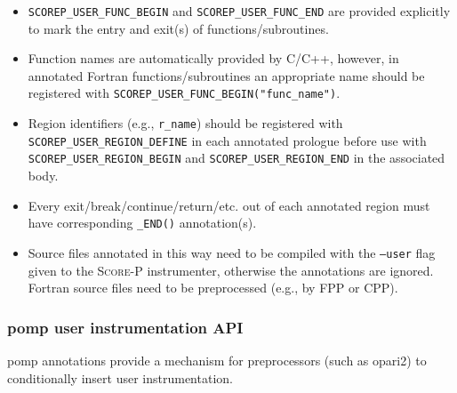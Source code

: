 \documentclass[a4paper]{article}
\newcommand{\Scorep}{\textsc{Score-P}\xspace}
\begin{document}
\begin{itemize}
  \item \texttt{SCOREP\_USER\_FUNC\_BEGIN} and \texttt{SCOREP\_USER\_FUNC\_END} are
provided explicitly to mark the entry and exit(s) of functions/subroutines.
  \item Function names are automatically provided by C/C++, however, in
annotated Fortran functions/subroutines an appropriate name should be
registered with \texttt{SCOREP\_USER\_FUNC\_BEGIN("func\_name")}.
  \item Region identifiers (e.g., \texttt{r\_name}) should be registered
with \texttt{SCOREP\_USER\_REGION\_DEFINE} in each annotated prologue before use with
\texttt{SCOREP\_USER\_REGION\_BEGIN} and \texttt{SCOREP\_USER\_REGION\_END} in the associated body.
  \item Every exit/break/continue/return/etc.{} out of each annotated region
must have corresponding \texttt{\_END()} annotation(s).
  \item Source files annotated in this way need to be compiled with the
\texttt{--user} flag given to the \Scorep instrumenter, otherwise the
annotations are ignored. Fortran source files need to be preprocessed
(e.g., by FPP or CPP).
\end{itemize}

\subsubsection*{{\sc pomp} user instrumentation API}
\label{sec:pomp_inst}

{\sc pomp} annotations provide a mechanism for preprocessors (such as
{\sc opari2}) to conditionally insert user instrumentation.
\end{document}
